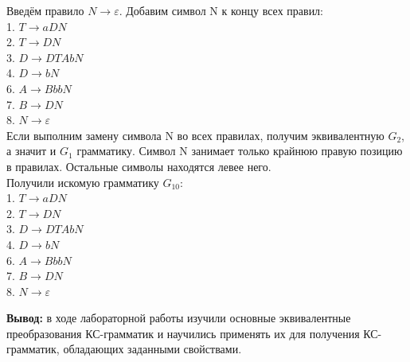\documentclass[a4paper,14pt]{extarticle}
\begin{document}
\begin{enumerate}[1.]
Введём правило $N \rightarrow \varepsilon$. Добавим символ N к концу всех правил:\\
1. $T \rightarrow aDN$\\
2. $T \rightarrow DN$\\
3. $D \rightarrow DTAbN$\\
4. $D \rightarrow bN$\\
6. $A \rightarrow BbbN$\\
7. $B \rightarrow DN$\\
8. $N \rightarrow \varepsilon$\\
Если выполним замену символа N во всех правилах, получим эквивалентную $G_2$, 
а значит и $G_1$ грамматику. Символ N занимает только крайнюю правую позицию в правилах.
Остальные символы находятся левее него.\\
Получили искомую грамматику $G_{10}$:\\
1. $T \rightarrow aDN$\\
2. $T \rightarrow DN$\\
3. $D \rightarrow DTAbN$\\
4. $D \rightarrow bN$\\
6. $A \rightarrow BbbN$\\
7. $B \rightarrow DN$\\
8. $N \rightarrow \varepsilon$\\

\end{enumerate}

\textbf{Вывод: } в ходе лабораторной работы изучили основные эквивалентные преобразования
КС-грамматик и научились применять их для получения
КС-грамматик, обладающих заданными свойствами.
\end{document}
